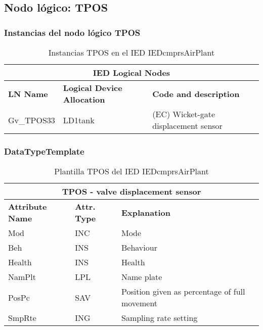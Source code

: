 
\subsection{Nodo l\'ogico: 			 TPOS}

    \subsubsection{Instancias del nodo l\'ogico TPOS}
    \begin{table}[H]
    \begin{center}
    \begin{tabular}{|l|l|p{6.8cm}|}
            \hline
            \multicolumn{3}{|c|}{\cellcolor[gray]{0.8} \textbf{IED Logical Nodes} } \\
            \hline
            \textbf{LN Name} & \textbf{Logical Device Allocation} & \textbf{Code and description} \\
            \hline
            Gv\_TPOS33 & LD1tank & (EC) Wicket-gate displacement sensor \\
            \hline
    \end{tabular}
    \caption{Instancias TPOS en el IED IEDcmprsAirPlant}
    \label{table:lnInstTPOS_e}
    \end{center}
    \end{table}
    
    
    
    \subsubsection{DataTypeTemplate}
    \begin{table}[H]
    \begin{center}
    \begin{tabular}{|l|l|p{8.5cm}|}
            \hline
            \multicolumn{3}{|c|}{\cellcolor[gray]{0.8} \textbf{ TPOS}  - valve displacement sensor} \\
            \hline
            \textbf{Attribute Name} & \textbf{Attr. Type} & \textbf{Explanation} \\
            \hline 
            Mod & INC & Mode \\
            \hline
            Beh & INS & Behaviour \\
            \hline
            Health & INS & Health \\
            \hline
            NamPlt & LPL & Name plate \\
            \hline
            PosPc & SAV & Position given as percentage of full movement \\
            \hline
            SmpRte & ING & Sampling rate setting \\
            \hline
    \end{tabular}
    \caption{Plantilla TPOS del IED IEDcmprsAirPlant}
    \label{table:lnTypeTPOS_e}
    \end{center}
    \end{table}
    
    
    